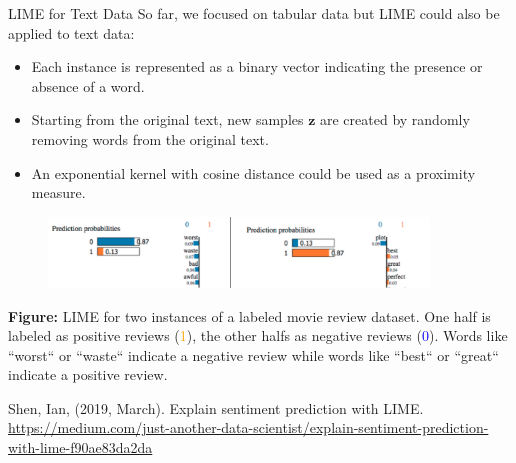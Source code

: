 \documentclass[11pt,compress,t,notes=noshow, xcolor=table]{beamer}
\newcommand{\zv}{\mathbf{z}}
\begin{document}
\begin{vbframe}{LIME for Text Data}
	So far, we focused on tabular data but LIME could also be applied to text data: 
	\begin{itemize}
		\item Each instance is represented as a binary vector indicating the presence or absence of a word.
		\item Starting from the original text, new samples $\zv$ are created by randomly removing words from the original text.
		\item An exponential kernel with cosine distance could be used as a proximity measure. 
	\end{itemize}
	
	\begin{figure}
		\begin{center}
			\includegraphics[width=0.9\textwidth]{figure/lime_movier}
		\end{center}
	\end{figure}
	
	
	\scriptsize{\textbf{Figure:} LIME for two instances of a labeled movie review dataset. One half is labeled as positive reviews (\textcolor{orange}{1}), 
		the other halfs as negative reviews (\textcolor{blue}{0}). Words like ``worst`` or ``waste`` indicate a negative review while words like ``best`` or ``great`` indicate a positive review.}
	
	{\tiny{Shen, Ian, (2019, March). Explain sentiment prediction with LIME.
			\url{https://medium.com/just-another-data-scientist/explain-sentiment-prediction-with-lime-f90ae83da2da}}\par}
	
	\end{vbframe}
	
\end{document}
